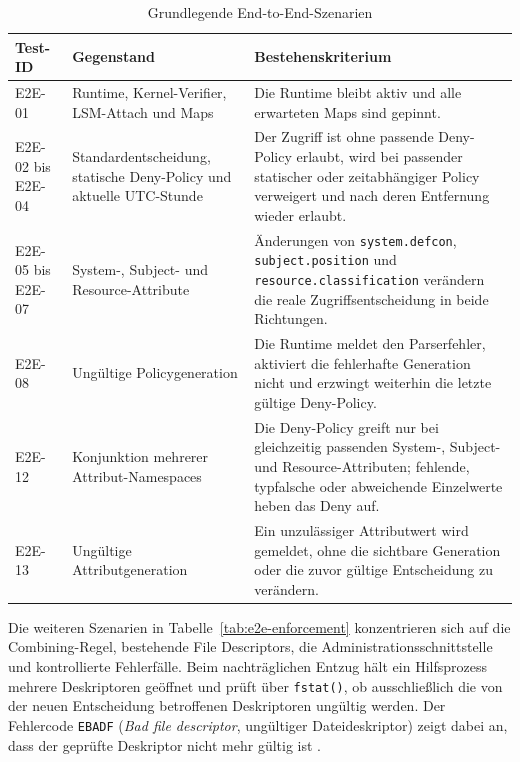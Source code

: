 \begin{table}[htbp]
    \centering


    \begin{tabular}{>{\raggedright\arraybackslash}p{}>{\raggedright\arraybackslash}p{}p{}}
        \hline
        \textbf{Test-ID} & \textbf{Gegenstand} & \textbf{Bestehenskriterium} \\
        \hline
        E2E-01 & Runtime, Kernel-Verifier, LSM-Attach und Maps & Die Runtime bleibt aktiv und alle
        erwarteten Maps sind gepinnt. \\
        E2E-02 bis E2E-04 & Standardentscheidung, statische Deny-Policy und aktuelle UTC-Stunde &
        Der Zugriff ist ohne passende Deny-Policy erlaubt, wird bei passender statischer oder
        zeitabhängiger Policy verweigert und nach deren Entfernung wieder erlaubt. \\
        E2E-05 bis E2E-07 & System-, Subject- und Resource-Attribute & Änderungen von
        \texttt{system.defcon}, \texttt{subject.position} und
        \texttt{resource.classification} verändern die reale Zugriffsentscheidung in beide
        Richtungen. \\
        E2E-08 & Ungültige Policygeneration & Die Runtime meldet den Parserfehler, aktiviert die
        fehlerhafte Generation nicht und erzwingt weiterhin die letzte gültige Deny-Policy. \\
        E2E-12 & Konjunktion mehrerer Attribut-Namespaces & Die Deny-Policy greift nur bei
        gleichzeitig passenden System-, Subject- und Resource-Attributen; fehlende, typfalsche
        oder abweichende Einzelwerte heben das Deny auf. \\
        E2E-13 & Ungültige Attributgeneration & Ein unzulässiger Attributwert wird gemeldet, ohne
        die sichtbare Generation oder die zuvor gültige Entscheidung zu verändern. \\
        \hline
    \end{tabular}
    \caption{Grundlegende End-to-End-Szenarien}
    \label{tab:e2e-basis}
\end{table}
Die weiteren Szenarien in Tabelle~\ref{tab:e2e-enforcement} konzentrieren sich auf die
Combining-Regel, bestehende File Descriptors, die Administrationsschnittstelle und kontrollierte
Fehlerfälle. Beim nachträglichen Entzug hält ein Hilfsprozess mehrere Deskriptoren geöffnet und
prüft über \texttt{fstat()}, ob ausschließlich die von der neuen Entscheidung betroffenen
Deskriptoren ungültig werden. Der Fehlercode \texttt{EBADF} (\emph{Bad file descriptor},
ungültiger Dateideskriptor) zeigt dabei an, dass der geprüfte Deskriptor nicht mehr gültig ist
\citep{manErrno}.

